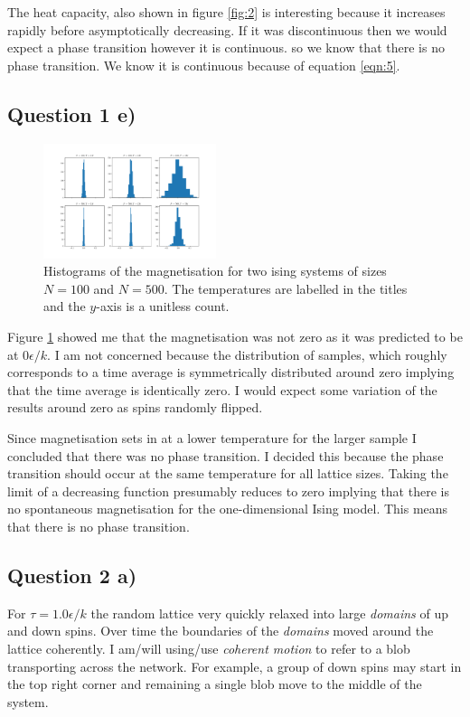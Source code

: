\documentclass[a4paper, twocolumn]{article}
\begin{document}
The heat capacity, also shown %
in figure \ref{fig:2} is interesting because it increases %
rapidly before asymptotically decreasing. If it was discontinuous %
then we would expect a phase transition however it is continuous. %
so we know that there is no phase transition. We know it is continuous %
because of equation \ref{eqn:5}. 


\subsection*{Question 1 e)}
\begin{figure}[h]
    \centering
    \includegraphics[width=0.45\textwidth]{pub/figures/magnetisation_ising_1d.pdf}
    \caption{Histograms of the magnetisation for two ising %
        systems of sizes \(N = 100\) and \(N = 500\). The %
        temperatures are labelled in the titles and the %
        \(y\)-axis is a unitless count.}
    \label{fig:3}
\end{figure}


Figure \ref{fig:3} showed me that the magnetisation was not zero %
as it was predicted to be at \(0 \epsilon / k\). I am not concerned %
because the distribution of samples, which roughly corresponds to %
a time average is symmetrically distributed around zero implying %
that the time average is identically zero. I would expect some %
variation of the results around zero as spins randomly flipped. %


Since magnetisation sets in at a lower temperature for the larger %
sample I concluded that there was no phase transition. I %
decided this because the phase transition should occur at the %
same temperature for all lattice sizes. Taking the limit of %
a decreasing function presumably reduces to zero implying that %
there is no spontaneous magnetisation for the one-dimensional %
Ising model. This means that there is no phase transition. 


\subsection*{Question 2 a)}
For \(\tau = 1.0 \epsilon / k\) the random lattice very quickly %
relaxed into large \emph{domains} of up and down spins. Over time %
the boundaries of the \emph{domains} moved around the lattice %
coherently. I am/will using/use \emph{coherent motion} to refer %
to a blob transporting across the network. For example, a group %
of down spins may start in the top right corner and remaining %
a single blob move to the middle of the system. 
\end{document}
